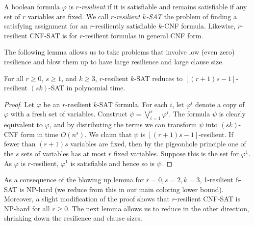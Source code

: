 \begin{problem}
A boolean formula $\varphi$ is \emph{$r$-resilient} if it is satisfiable and
remains satisfiable if any set of $r$ variables are fixed. We call
\emph{$r$-resilient $k$-SAT} the problem of finding a satisfying assignment
for an $r$-resiliently satisfiable $k$-CNF formula. Likewise, $r$-resilient
CNF-SAT is for $r$-resilient formulas in general CNF form.  
\end{problem}

The following lemma allows us to take problems that involve low (even zero)
resilience and blow them up to have large resilience and large clause size.

\begin{lemma}[blowing up]
\label{lemma:up}For all $r \geq 0$, $s \geq 1$, and $k \geq 3$, $r$-resilient
$k$-SAT reduces to $[(r+1)s-1]$-resilient $(sk)$-SAT in polynomial time.

\end{lemma}
\begin{proof}

Let $\varphi$ be an $r$-resilient $k$-SAT formula. For each $i$, let
$\varphi^i$ denote a copy of $\varphi$ with a fresh set of variables. Construct
$\psi = \bigvee_{i = 1}^s \varphi^i$. The formula $\psi$ is clearly equivalent
to $\varphi$, and by distributing the terms we can transform $\psi$ into
$(sk)$-CNF form in time $O(n^s)$. We claim that $\psi$ is $[(r+1)s -
1]$-resilient. If fewer than $(r+1)s$ variables are fixed, then by the
pigeonhole principle one of the $s$ sets of variables has at most $r$ fixed
variables. Suppose this is the set for $\varphi^1$. As $\varphi$ is
$r$-resilient, $\varphi^1$ is satisfiable and hence so is $\psi$.
\end{proof}

As a consequence of the blowing up lemma for $r=0, s=2, k=3$, 1-resilient 6-SAT
is NP-hard (we reduce from this in our main coloring lower bound). Moreover, a
slight modification of the proof shows that $r$-resilient CNF-SAT is NP-hard
for all $r \geq 0$. The next lemma allows us to reduce in the other direction,
shrinking down the resilience and clause sizes.

